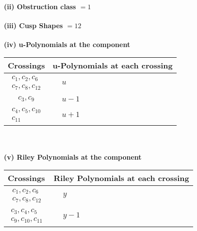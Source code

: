 \documentclass[1p]{elsarticle_modified}
\theoremstyle{definition}
\begin{document}
\flushleft \textbf{(ii) Obstruction class $= 1$}\\~\\
\flushleft \textbf{(iii) Cusp Shapes $= 12$}\\~\\
\newpage\renewcommand{\arraystretch}{1}
\flushleft \textbf{(iv) u-Polynomials at the component}\newline \\
\begin{tabular}{m{50pt}|m{274pt}}
Crossings & \hspace{64pt}u-Polynomials at each crossing \\
\hline $$\begin{aligned}c_{1},c_{2},c_{6}\\c_{7},c_{8},c_{12}\end{aligned}$$&$\begin{aligned}
&u
\end{aligned}$\\
\hline $$\begin{aligned}c_{3},c_{9}\end{aligned}$$&$\begin{aligned}
&u-1
\end{aligned}$\\
\hline $$\begin{aligned}c_{4},c_{5},c_{10}\\c_{11}\end{aligned}$$&$\begin{aligned}
&u+1
\end{aligned}$\\
\hline
\end{tabular}\\~\\
\newpage\renewcommand{\arraystretch}{1}
\flushleft \textbf{(v) Riley Polynomials at the component}\newline \\
\begin{tabular}{m{50pt}|m{274pt}}
Crossings & \hspace{64pt}Riley Polynomials at each crossing \\
\hline $$\begin{aligned}c_{1},c_{2},c_{6}\\c_{7},c_{8},c_{12}\end{aligned}$$&$\begin{aligned}
&y
\end{aligned}$\\
\hline $$\begin{aligned}c_{3},c_{4},c_{5}\\c_{9},c_{10},c_{11}\end{aligned}$$&$\begin{aligned}
&y-1
\end{aligned}$\\
\hline
\end{tabular}\\~\\
\end{document}
